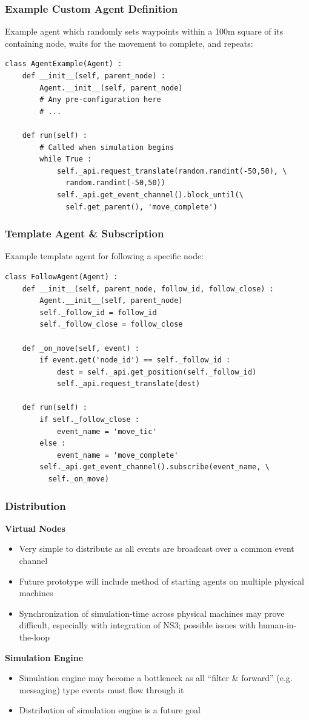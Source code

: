 \documentclass[mathserif]{beamer}
\begin{document}
\begin{frame}[fragile]
    \frametitle{Example Custom Agent Definition}
    Example agent which randomly sets waypoints within a 100m square of its containing node, waits for the movement to complete, and repeats:
    {\footnotesize
    \begin{verbatim}
class AgentExample(Agent) :
    def __init__(self, parent_node) :
        Agent.__init__(self, parent_node)
        # Any pre-configuration here
        # ...

    def run(self) :
        # Called when simulation begins
        while True :
            self._api.request_translate(random.randint(-50,50), \ 
              random.randint(-50,50))
            self._api.get_event_channel().block_until(\
              self.get_parent(), 'move_complete')
    \end{verbatim}}
\end{frame}

\begin{frame}[fragile]
    \frametitle{Template Agent \& Subscription}
    Example template agent for following a specific node:
    {\footnotesize
    \begin{verbatim}
class FollowAgent(Agent) :
    def __init__(self, parent_node, follow_id, follow_close) :
        Agent.__init__(self, parent_node)
        self._follow_id = follow_id
        self._follow_close = follow_close

    def _on_move(self, event) :
        if event.get('node_id') == self._follow_id :
            dest = self._api.get_position(self._follow_id)
            self._api.request_translate(dest)

    def run(self) :
        if self._follow_close :
            event_name = 'move_tic'
        else :
            event_name = 'move_complete'
        self._api.get_event_channel().subscribe(event_name, \
          self._on_move)
    \end{verbatim}}
\end{frame}

\frame
{
    \frametitle{Distribution}
    \textbf{Virtual Nodes}
    \begin{itemize}
	\item Very simple to distribute as all events are broadcast over a common event channel
	\item Future prototype will include method of starting agents on multiple physical machines
	\item Synchronization of simulation-time across physical machines may prove difficult, especially with integration of NS3; possible issues with human-in-the-loop
    \end{itemize}
    \textbf{Simulation Engine}
    \begin{itemize}
	\item Simulation engine may become a bottleneck as all ``filter \& forward'' (e.g. messaging) type events must flow through it
	\item Distribution of simulation engine is a future goal 
    \end{itemize}
}
\end{document}

